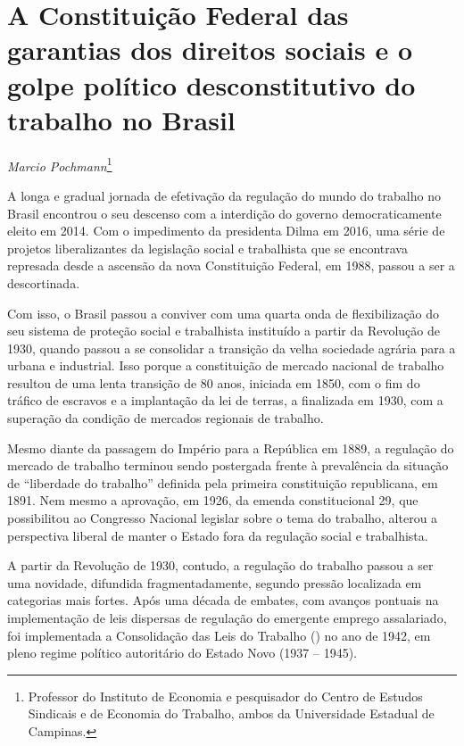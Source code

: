 \chapter*{A Constituição Federal das garantias dos direitos sociais e o
golpe político desconstitutivo do trabalho no Brasil}


\begin{flushright}
\emph{Marcio Pochmann}\footnote{Professor do Instituto de Economia e
  pesquisador do Centro de Estudos Sindicais e de Economia do Trabalho,
  ambos da Universidade Estadual de Campinas.}
\end{flushright}

A longa e gradual jornada de efetivação da regulação do mundo do
trabalho no Brasil encontrou o seu descenso com a interdição do governo
democraticamente eleito em 2014. Com o impedimento da presidenta Dilma
em 2016, uma série de projetos liberalizantes da legislação social e
trabalhista que se encontrava represada desde a ascensão da nova
Constituição Federal, em 1988, passou a ser a descortinada.

Com isso, o Brasil passou a conviver com uma quarta onda de
flexibilização do seu sistema de proteção social e trabalhista
instituído a partir da Revolução de 1930, quando passou a se consolidar
a transição da velha sociedade agrária para a urbana e industrial. Isso
porque a constituição de mercado nacional de trabalho resultou de uma
lenta transição de 80 anos, iniciada em 1850, com o fim do tráfico de
escravos e a implantação da lei de terras, a finalizada em 1930, com a
superação da condição de mercados regionais de trabalho.

Mesmo diante da passagem do Império para a República em 1889, a
regulação do mercado de trabalho terminou sendo postergada frente à
prevalência da situação de ``liberdade do trabalho'' definida pela
primeira constituição republicana, em 1891. Nem mesmo a aprovação, em
1926, da emenda constitucional 29, que possibilitou ao Congresso
Nacional legislar sobre o tema do trabalho, alterou a perspectiva
liberal de manter o Estado fora da regulação social e trabalhista.

A partir da Revolução de 1930, contudo, a regulação do trabalho passou a
ser uma novidade, difundida fragmentadamente, segundo pressão localizada
em categorias mais fortes. Após uma década de embates, com avanços
pontuais na implementação de leis dispersas de regulação do emergente
emprego assalariado, foi implementada a Consolidação das Leis do
Trabalho () no ano de 1942, em pleno regime político autoritário do
Estado Novo (1937 -- 1945).


